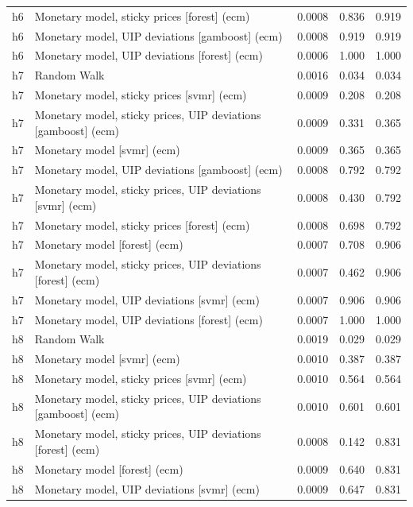 \begin{ThreePartTable}
\begin{longtable}[t]{cp{5.5cm}ccc}
h6 & \raggedright Monetary model, sticky prices [forest] (ecm) & 0.0008 & 0.836 & 0.919\\
h6 & \raggedright Monetary model, UIP deviations [gamboost] (ecm) & 0.0008 & 0.919 & 0.919\\
h6 & \raggedright Monetary model, UIP deviations [forest] (ecm) & 0.0006 & 1.000 & 1.000\\
\addlinespace
h7 & \raggedright Random Walk & 0.0016 & 0.034 & 0.034\\
h7 & \raggedright Monetary model, sticky prices [svmr] (ecm) & 0.0009 & 0.208 & 0.208\\
h7 & \raggedright Monetary model, sticky prices, UIP deviations [gamboost] (ecm) & 0.0009 & 0.331 & 0.365\\
h7 & \raggedright Monetary model [svmr] (ecm) & 0.0009 & 0.365 & 0.365\\
h7 & \raggedright Monetary model, UIP deviations [gamboost] (ecm) & 0.0008 & 0.792 & 0.792\\
h7 & \raggedright Monetary model, sticky prices, UIP deviations [svmr] (ecm) & 0.0008 & 0.430 & 0.792\\
h7 & \raggedright Monetary model, sticky prices [forest] (ecm) & 0.0008 & 0.698 & 0.792\\
h7 & \raggedright Monetary model [forest] (ecm) & 0.0007 & 0.708 & 0.906\\
h7 & \raggedright Monetary model, sticky prices, UIP deviations [forest] (ecm) & 0.0007 & 0.462 & 0.906\\
h7 & \raggedright Monetary model, UIP deviations [svmr] (ecm) & 0.0007 & 0.906 & 0.906\\
h7 & \raggedright Monetary model, UIP deviations [forest] (ecm) & 0.0007 & 1.000 & 1.000\\
\addlinespace
h8 & \raggedright Random Walk & 0.0019 & 0.029 & 0.029\\
h8 & \raggedright Monetary model [svmr] (ecm) & 0.0010 & 0.387 & 0.387\\
h8 & \raggedright Monetary model, sticky prices [svmr] (ecm) & 0.0010 & 0.564 & 0.564\\
h8 & \raggedright Monetary model, sticky prices, UIP deviations [gamboost] (ecm) & 0.0010 & 0.601 & 0.601\\
h8 & \raggedright Monetary model, sticky prices, UIP deviations [forest] (ecm) & 0.0008 & 0.142 & 0.831\\
h8 & \raggedright Monetary model [forest] (ecm) & 0.0009 & 0.640 & 0.831\\
h8 & \raggedright Monetary model, UIP deviations [svmr] (ecm) & 0.0009 & 0.647 & 0.831\\

\end{longtable}
\end{ThreePartTable}

